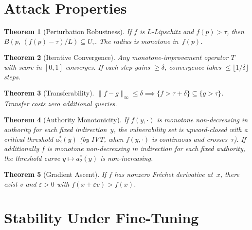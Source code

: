 \documentclass[11pt]{article}
\newtheorem{theorem}{Theorem}[section]
\begin{document}
\begin{table}[h]
\centering
\small
\caption{Counterexample ablation. Each row drops one of the three
hypotheses and reports whether the defense becomes complete, together
with the price paid in the other two properties.}
\label{tab:counterexample-ablation}

\end{table}


\section{Attack Properties}
\label{app:attacks}

\begin{theorem}[Perturbation Robustness]
\label{thm:lipschitz}
If $f$ is $L$-Lipschitz and $f(p)>\tau$, then
$B(p,\, (f(p)-\tau)/L) \subseteq U_\tau$.
The radius is monotone in~$f(p)$.
\end{theorem}

\begin{theorem}[Iterative Convergence]
\label{thm:convergence}
Any monotone-improvement operator $T$ with score in $[0,1]$ converges.
If each step gains $\geq \delta$, convergence takes
$\leq \lfloor 1/\delta \rfloor$ steps.
\end{theorem}

\begin{theorem}[Transferability]
\label{thm:transfer}
$\|f-g\|_\infty \leq \delta \implies
\{f > \tau+\delta\} \subseteq \{g > \tau\}$.
Transfer costs zero additional queries.
\end{theorem}

\begin{theorem}[Authority Monotonicity]
\label{thm:authority}
If $f(y,\cdot)$ is monotone non-decreasing in authority for each fixed
indirection~$y$, the vulnerability set is upward-closed with a critical
threshold $a^*_2(y)$ (by IVT, when $f(y,\cdot)$ is continuous and
crosses~$\tau$). If additionally $f$ is monotone non-decreasing in
indirection for each fixed authority, the threshold curve
$y \mapsto a^*_2(y)$ is non-increasing.
\end{theorem}

\begin{theorem}[Gradient Ascent]
\label{thm:gradient}
If $f$ has nonzero Fr\'{e}chet derivative at~$x$, there exist $v$ and
$\varepsilon > 0$ with $f(x + \varepsilon v) > f(x)$.
\end{theorem}


\section{Stability Under Fine-Tuning}
\label{app:stability}
\end{document}
